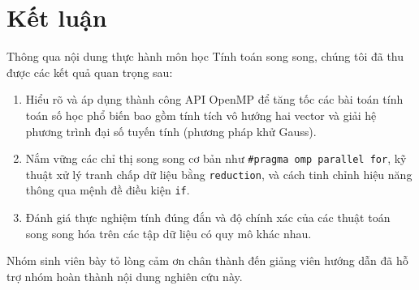 \chapter*{Kết luận}

Thông qua nội dung thực hành môn học Tính toán song song, chúng tôi đã thu được các kết quả quan trọng sau:
\begin{enumerate}
    \item Hiểu rõ và áp dụng thành công API OpenMP để tăng tốc các bài toán tính toán số học phổ biến bao gồm tính tích vô hướng hai vector và giải hệ phương trình đại số tuyến tính (phương pháp khử Gauss).
    \item Nắm vững các chỉ thị song song cơ bản như \texttt{\#pragma omp parallel for}, kỹ thuật xử lý tranh chấp dữ liệu bằng \texttt{reduction}, và cách tinh chỉnh hiệu năng thông qua mệnh đề điều kiện \texttt{if}.
    \item Đánh giá thực nghiệm tính đúng đắn và độ chính xác của các thuật toán song song hóa trên các tập dữ liệu có quy mô khác nhau.
\end{enumerate}

Nhóm sinh viên bày tỏ lòng cảm ơn chân thành đến giảng viên hướng dẫn đã hỗ trợ nhóm hoàn thành nội dung nghiên cứu này.

